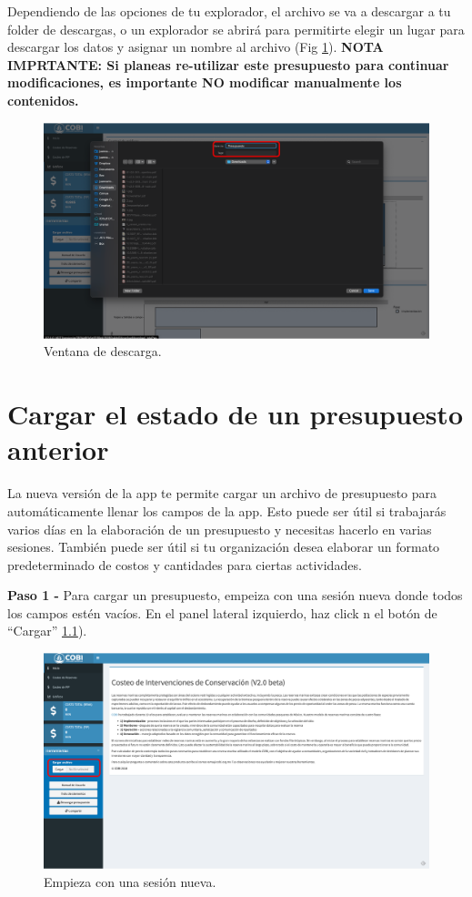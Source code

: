 \documentclass[
]{book}
\begin{document}
Dependiendo de las opciones de tu explorador, el archivo se va a descargar a tu folder de descargas, o un explorador se abrirá para permitirte elegir un lugar para descargar los datos y asignar un nombre al archivo (Fig \ref{fig:down-2}). \textbf{NOTA IMPRTANTE: Si planeas re-utilizar este presupuesto para continuar modificaciones, es importante NO modificar manualmente los contenidos.}

\begin{figure}
\includegraphics[width=61.11in]{images/down-2} \caption{Ventana de descarga.}\label{fig:down-2}
\end{figure}

\hypertarget{cargar}{%
\chapter{Cargar el estado de un presupuesto anterior}\label{cargar}}

La nueva versión de la app te permite cargar un archivo de presupuesto para automáticamente llenar los campos de la app. Esto puede ser útil si trabajarás varios días en la elaboración de un presupuesto y necesitas hacerlo en varias sesiones. También puede ser útil si tu organización desea elaborar un formato predeterminado de costos y cantidades para ciertas actividades.

\textbf{Paso 1 - } Para cargar un presupuesto, empeiza con una sesión nueva donde todos los campos estén vacíos. En el panel lateral izquierdo, haz click n el botón de ``Cargar'' \ref{fig:up-1}).

\begin{figure}
\includegraphics[width=61.11in]{images/up-1} \caption{Empieza con una sesión nueva.}\label{fig:up-1}
\end{figure}
\end{document}
